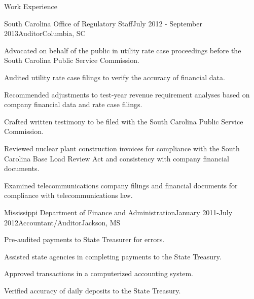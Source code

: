 \documentclass{resume} %
\begin{document}
\begin{rSection}{Work Experience}
\begin{rSubsection}{South Carolina Office of Regulatory Staff}{July 2012 - September 2013}{Auditor}{Columbia, SC}
\item Advocated on behalf of the public in utility rate case proceedings before the South Carolina Public Service Commission.
\item Audited utility rate case filings to verify the accuracy of financial data.
\item Recommended adjustments to test-year revenue requirement analyses based on company financial data and rate case filings.
\item Crafted written testimony to be filed with the South Carolina Public Service Commission.
\item Reviewed nuclear plant construction invoices for compliance with the South Carolina Base Load Review Act and consistency with company financial documents.
\item Examined telecommunications company filings and financial documents for compliance with telecommunications law.

\end{rSubsection}

\begin{rSubsection}{Mississippi Department of Finance and Administration}{January 2011-July 2012}{Accountant/Auditor}{Jackson, MS}
\item Pre-audited payments to State Treasurer for errors.
\item Assisted state agencies in completing payments to the State Treasury.
\item Approved transactions in a computerized accounting system.
\item Verified accuracy of daily deposits to the State Treasury.


\end{rSubsection}
\end{rSection}

\end{document}
